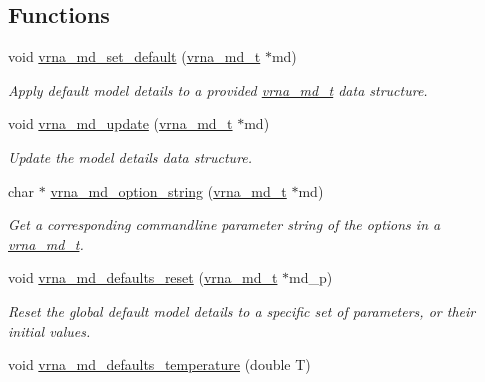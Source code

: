 \subsection*{Functions}
\begin{DoxyCompactItemize}
\item 
void \hyperlink{group__model__details_ga8ac6ff84936282436f822644bf841f66}{vrna\-\_\-md\-\_\-set\-\_\-default} (\hyperlink{group__model__details_ga1f8a10e12a0a1915f2a4eff0b28ea17c}{vrna\-\_\-md\-\_\-t} $\ast$md)
\begin{DoxyCompactList}\small\item\em Apply default model details to a provided \hyperlink{group__model__details_ga1f8a10e12a0a1915f2a4eff0b28ea17c}{vrna\-\_\-md\-\_\-t} data structure. \end{DoxyCompactList}\item 
void \hyperlink{group__model__details_ga36ae40b8c3b82362f5798ad5b047b814}{vrna\-\_\-md\-\_\-update} (\hyperlink{group__model__details_ga1f8a10e12a0a1915f2a4eff0b28ea17c}{vrna\-\_\-md\-\_\-t} $\ast$md)
\begin{DoxyCompactList}\small\item\em Update the model details data structure. \end{DoxyCompactList}\item 
char $\ast$ \hyperlink{group__model__details_ga3a7469f0725a849af6ba61a57dfd60ce}{vrna\-\_\-md\-\_\-option\-\_\-string} (\hyperlink{group__model__details_ga1f8a10e12a0a1915f2a4eff0b28ea17c}{vrna\-\_\-md\-\_\-t} $\ast$md)
\begin{DoxyCompactList}\small\item\em Get a corresponding commandline parameter string of the options in a \hyperlink{group__model__details_ga1f8a10e12a0a1915f2a4eff0b28ea17c}{vrna\-\_\-md\-\_\-t}. \end{DoxyCompactList}\item 
void \hyperlink{group__model__details_ga70834424cf804d149937de89f80ceb45}{vrna\-\_\-md\-\_\-defaults\-\_\-reset} (\hyperlink{group__model__details_ga1f8a10e12a0a1915f2a4eff0b28ea17c}{vrna\-\_\-md\-\_\-t} $\ast$md\-\_\-p)
\begin{DoxyCompactList}\small\item\em Reset the global default model details to a specific set of parameters, or their initial values. \end{DoxyCompactList}\item 
void \hyperlink{group__model__details_gaf9e527e9a2f7e6fd6e42bc6e602f5445}{vrna\-\_\-md\-\_\-defaults\-\_\-temperature} (double T)

\end{DoxyCompactItemize}
